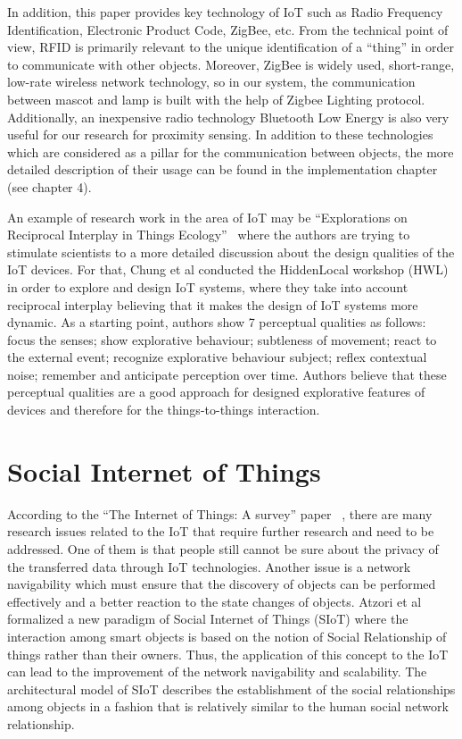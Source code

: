 In addition, this paper provides key technology of IoT such as Radio Frequency Identification,
Electronic Product Code, ZigBee, etc.
From the technical point of view, RFID is primarily relevant to the unique identification of
a “thing” in order to communicate with other objects.
Moreover, ZigBee is widely used, short-range, low-rate wireless network technology, so in our
system, the communication between mascot and lamp is built with the help of Zigbee Lighting protocol.
Additionally, an inexpensive radio technology Bluetooth Low Energy is also very useful
for our research for proximity sensing.
In addition to these technologies which are considered as a pillar for the communication between
objects, the more detailed description of their usage can be found in the implementation chapter (see chapter 4).

An example of research work in the area of IoT may be “Explorations on Reciprocal
Interplay in Things Ecology”~\cite{chung2018explorations} where the authors are trying to
stimulate scientists to a more detailed discussion about the design qualities of the IoT devices.
For that, Chung et al conducted the HiddenLocal workshop (HWL) in order to explore and design
IoT systems, where they take into account reciprocal interplay believing that it makes the
design of IoT systems more dynamic.
As a starting point, authors show 7 perceptual qualities as follows: focus the senses;
show explorative behaviour;
subtleness of movement;
react to the external event;
recognize explorative behaviour subject;
reflex contextual noise;
remember and anticipate perception over time.
Authors believe that these perceptual qualities are a good approach for designed explorative
features of devices and therefore for the things-to-things interaction.

\section{Social Internet of Things}
\label{sec:Social Internet of Things}
According to the “The Internet of Things: A survey” paper ~\cite{atzori2010internet},
there are many research issues related to the IoT that require further
research and need to be addressed.
One of them is that people still cannot be sure about the privacy of the transferred data
through IoT technologies.
Another issue is a network navigability which must ensure that the discovery of objects can be
performed effectively and a better reaction to the state changes of objects.
Atzori et al ~\cite{atzori2011siot} formalized a new paradigm of Social Internet of Things (SIoT)
where the interaction among smart objects is based on the notion of Social
Relationship of things rather than their owners.
Thus, the application of this concept to the IoT can lead to the improvement
of the network navigability and scalability.
The architectural model of SIoT describes the establishment of the social relationships
among objects in a fashion that is relatively similar to the human social network relationship.

